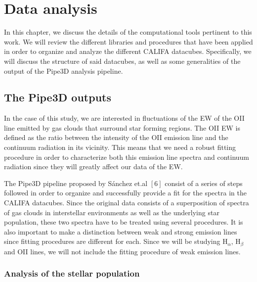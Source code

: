 

\chapter{Data analysis}

In this chapter, we discuss the details of the computational tools pertinent to this work.
We will review the different libraries and procedures that have been applied in order to organize and analyze the different CALIFA
datacubes. Specifically, we will discuss the structure of said datacubes, as well as some generalities of the output of the
Pipe3D analysis pipeline.

\section{The Pipe3D outputs}

In the case of this study, we are interested in fluctuations of the EW of the OII line emitted by gas clouds that surround star
forming regions. The OII EW is defined as the ratio between the intensity of the OII emission line and the continuum radiation
in its vicinity. This means that we need a robust fitting procedure in order to characterize both this emission line spectra
and continuum radiation since they will greatly affect our data of the EW.

The Pipe3D pipeline proposed by S\'anchez et.al $\left[6\right]$ consist of a series of steps followed in order to
organize and successfully provide a fit for the spectra in the CALIFA datacubes. Since the original data consists of a superposition
of spectra of gas clouds in interstellar environments as well as the underlying star population, these two spectra have to be
treated using several procedures. It is also important to make a distinction between weak and strong emission lines since fitting
 procedures are different for each. Since we will be studying H$_{\alpha}$, H$_{\beta}$ and OII lines, we will not include the
 fitting procedure of weak emission lines.

\subsection{Analysis of the stellar population}

